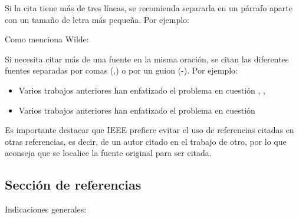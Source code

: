 \documentclass{jornadas}
\begin{document}
Si la cita tiene más de tres líneas, se recomienda separarla en un párrafo aparte con un tamaño de letra más pequeña. Por ejemplo:

Como menciona Wilde:

\begin{quote}
    \lipsum[1]
    \cite[p. 537]{zeng2014optimized}
\end{quote}

Si necesita citar más de una fuente en la misma oración, se citan las diferentes fuentes separadas por comas (,) o por un guion (-). Por ejemplo: 

\begin{itemize}
\itshape
    \item Varios trabajos anteriores han enfatizado el problema en cuestión \cite{marchette2005random}, \cite{horn1986robot}, \cite{huang2009coupled}
    \item Varios trabajos anteriores han enfatizado el problema en cuestión \cite{marchette2005random,horn1986robot,huang2009coupled}
\end{itemize}

Es importante destacar que IEEE prefiere evitar el uso de referencias citadas en otras referencias, es decir, de un autor citado en el trabajo de otro, por lo que aconseja que se localice la fuente original para ser citada.

\subsection{Sección de referencias}

Indicaciones generales:
\end{document}

